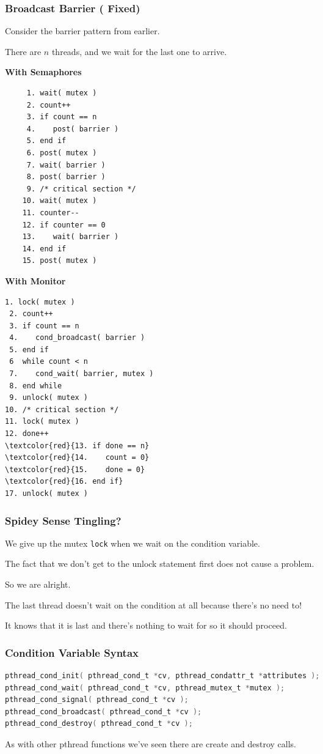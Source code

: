\begin{frame}[fragile]
	\frametitle{Broadcast Barrier ({\color{red} Fixed})}

	Consider the barrier pattern from earlier.

	There are $n$ threads, and we wait for the last one to arrive.
		{\small
			\begin{multicols}{2}
				\textbf{With Semaphores}
				\begin{verbatim}
	 1. wait( mutex )
	 2. count++
	 3. if count == n
	 4.    post( barrier )
	 5. end if
	 6. post( mutex )
	 7. wait( barrier )
	 8. post( barrier )
	 9. /* critical section */
	10. wait( mutex )
	11. counter--
	12. if counter == 0
	13.    wait( barrier )
	14. end if
	15. post( mutex )
  				\end{verbatim}
				\columnbreak
				\textbf{With Monitor}\vspace{-1em}
				\begin{Verbatim}[commandchars=\\\{\}]
 1. lock( mutex )
 2. count++
 3. if count == n
 4.    cond_broadcast( barrier )
 5. end if
 6  while count < n
 7.    cond_wait( barrier, mutex )
 8. end while
 9. unlock( mutex )
10. /* critical section */
11. lock( mutex )
12. done++
\textcolor{red}{13. if done == n}
\textcolor{red}{14.    count = 0}
\textcolor{red}{15.    done = 0}
\textcolor{red}{16. end if}
17. unlock( mutex )
  				\end{Verbatim}
			\end{multicols}
		}


\end{frame}

\begin{frame}
	\frametitle{Spidey Sense Tingling?}


	We give up the mutex \texttt{lock} when we wait on the condition variable.

	The fact that we don't get to the unlock statement first does not cause a problem.

	So we are alright.

	The last thread doesn't wait on the condition at all because there's no need to!

	It knows that it is last and there's nothing to wait for so it should proceed.

\end{frame}


\begin{frame}[fragile]
	\frametitle{Condition Variable Syntax}

	\begin{lstlisting}[language=C]
pthread_cond_init( pthread_cond_t *cv, pthread_condattr_t *attributes );
pthread_cond_wait( pthread_cond_t *cv, pthread_mutex_t *mutex );
pthread_cond_signal( pthread_cond_t *cv );
pthread_cond_broadcast( pthread_cond_t *cv );
pthread_cond_destroy( pthread_cond_t *cv );
\end{lstlisting}

	As with other pthread functions we've seen there are create and destroy calls.

\end{frame}

